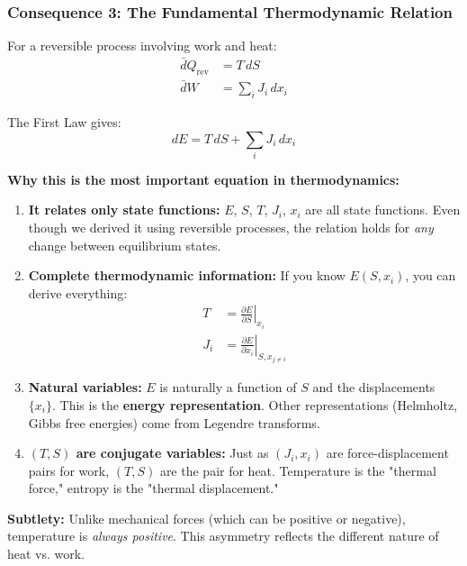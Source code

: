 \documentclass[9pt,twocoloumn]{article}
\begin{document}
\subsubsection{Consequence 3: The Fundamental Thermodynamic Relation}

For a reversible process involving work and heat:
\begin{align}
\bar{d}Q_{\text{rev}} &= T \, dS \\
\bar{d}W &= \sum_i J_i \, dx_i
\end{align}

The First Law gives:
\begin{equation}
\boxed{dE = T \, dS + \sum_i J_i \, dx_i}
\end{equation}

\textbf{Why this is the most important equation in thermodynamics:}

\begin{enumerate}
    \item \textbf{It relates only state functions:} $E$, $S$, $T$, $J_i$, $x_i$ are all state functions. Even though we derived it using reversible processes, the relation holds for \emph{any} change between equilibrium states.

    \item \textbf{Complete thermodynamic information:} If you know $E(S, x_i)$, you can derive everything:
    \begin{align}
    T &= \left. \frac{\partial E}{\partial S} \right|_{x_i} \\
    J_i &= \left. \frac{\partial E}{\partial x_i} \right|_{S, x_{j \neq i}}
    \end{align}

    \item \textbf{Natural variables:} $E$ is naturally a function of $S$ and the displacements $\{x_i\}$. This is the \textbf{energy representation}. Other representations (Helmholtz, Gibbs free energies) come from Legendre transforms.

    \item \textbf{$(T, S)$ are conjugate variables:} Just as $(J_i, x_i)$ are force-displacement pairs for work, $(T, S)$ are the pair for heat. Temperature is the "thermal force," entropy is the "thermal displacement."
\end{enumerate}

\textbf{Subtlety:} Unlike mechanical forces (which can be positive or negative), temperature is \emph{always positive}. This asymmetry reflects the different nature of heat vs. work.
\end{document}
